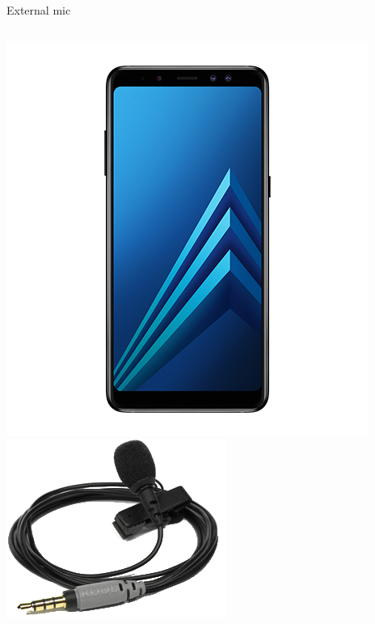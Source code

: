 \documentclass[serif,14pt,color=usenames,dvipsnames]{beamer}
\begin{document}
\begin{frame}{External mic}
\begin{columns}
    \includegraphics[width=\linewidth]{imgs/phone}
    \includegraphics[width=\linewidth]{imgs/mic}

\end{columns}
\end{frame}
\end{document}
